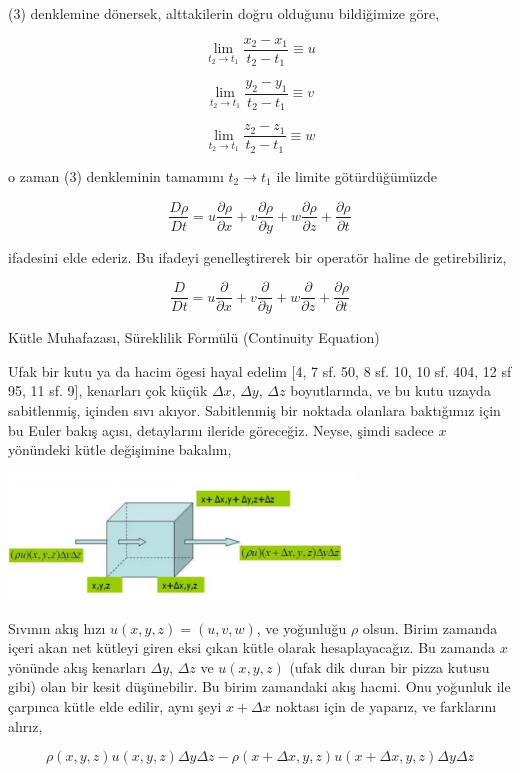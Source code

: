 \documentclass[12pt,fleqn]{article}\usepackage{../../common}
\begin{document}
(3) denklemine dönersek, alttakilerin doğru olduğunu bildiğimize göre,

$$
\lim_{t_2 \to t_1} \frac{x_2 - x_1}{t_2 - t_1} \equiv u
$$

$$
\lim_{t_2 \to t_1} \frac{y_2 - y_1}{t_2 - t_1} \equiv v
$$

$$
\lim_{t_2 \to t_1} \frac{z_2 - z_1}{t_2 - t_1} \equiv w
$$

o zaman (3) denkleminin tamamını $t_2 \to t_1$ ile limite götürdüğümüzde

$$
\frac{D\rho}{D t} =
u \frac{\partial \rho}{\partial x} + 
v \frac{\partial \rho}{\partial y} + 
w \frac{\partial \rho}{\partial z} + 
\frac{\partial \rho}{\partial t} 
$$

ifadesini elde ederiz. Bu ifadeyi genelleştirerek bir operatör haline de
getirebiliriz,

$$
\frac{D}{D t} =
u \frac{\partial }{\partial x} + 
v \frac{\partial }{\partial y} + 
w \frac{\partial }{\partial z} + 
\frac{\partial \rho}{\partial t} 
$$


Kütle Muhafazası, Süreklilik Formülü (Continuity Equation)

Ufak bir kutu ya da hacim ögesi hayal edelim [4, 7 sf. 50, 8 sf. 10, 10 sf. 404, 12
  sf 95, 11 sf. 9], kenarları çok küçük $\Delta x$, $\Delta y$, $\Delta z$
boyutlarında, ve bu kutu uzayda sabitlenmiş, içinden sıvı akıyor. Sabitlenmiş
bir noktada olanlara baktığımız için bu Euler bakış açısı, detaylarını ileride
göreceğiz. Neyse, şimdi sadece $x$ yönündeki kütle değişimine bakalım,

\includegraphics[width=25em]{phy_050_cons_03.png}

Sıvının akış hızı $u(x,y,z) = (u,v,w)$, ve yoğunluğu $\rho$ olsun. Birim zamanda
içeri akan net kütleyi giren eksi çıkan kütle olarak hesaplayacağız. Bu zamanda
$x$ yönünde akış kenarları $\Delta y$, $\Delta z$ ve $u(x,y,z)$ (ufak dik duran
bir pizza kutusu gibi) olan bir kesit düşünebilir. Bu birim zamandaki akış
hacmi.  Onu yoğunluk ile çarpınca kütle elde edilir, aynı şeyi $x + \Delta x$
noktası için de yaparız, ve farklarını alırız,

$$
\rho(x,y,z)u(x,y,z)\Delta y \Delta z -
\rho(x+\Delta x,y,z) u(x+\Delta x,y,z)\Delta y \Delta z
$$
\end{document}
